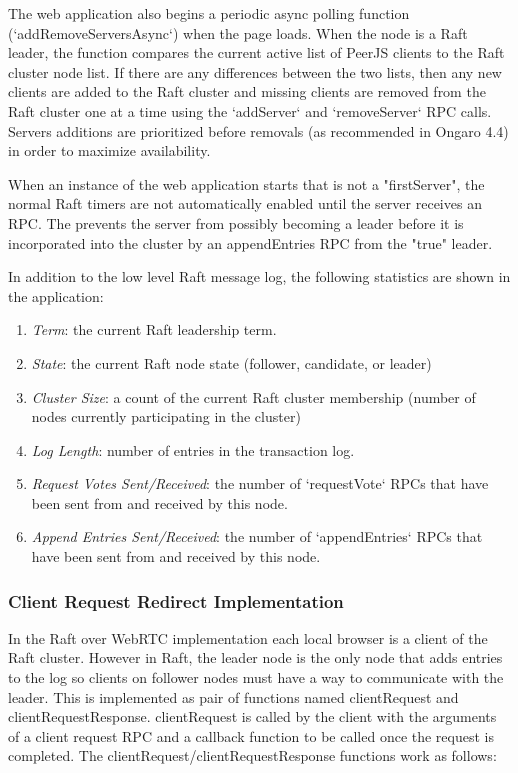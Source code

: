 \documentclass[9pt]{extarticle}
\begin{document}
\begin{multicols}{2}
The web application also begins a periodic async polling function
(`addRemoveServersAsync`) when the page loads. When the node is a Raft
leader, the function compares the current active list of PeerJS clients to
the Raft cluster node list. If there are any differences between the
two lists, then any new clients are added to the Raft cluster and
missing clients are removed from the Raft cluster one at a time using
the `addServer` and `removeServer` RPC calls. Servers additions are
prioritized before removals (as recommended in Ongaro 4.4) %
in order to maximize availability.

When an instance of the web application starts that is not
a "firstServer", the normal Raft timers are not automatically enabled
until the server receives an RPC. The prevents the server from
possibly becoming a leader before it is incorporated into the cluster
by an appendEntries RPC from the "true" leader.

In addition to the low level Raft message log, the following
statistics are shown in the application:

\begin{enumerate}
\item \emph{Term}: the current Raft leadership term.
\item \emph{State}: the current Raft node state (follower, candidate, or leader)
\item \emph{Cluster Size}: a count of the current Raft cluster membership (number of nodes currently participating in the cluster)
\item \emph{Log Length}: number of entries in the transaction log.
\item \emph{Request Votes Sent/Received}: the number of `requestVote` RPCs that have been sent from and received by this node.
\item \emph{Append Entries Sent/Received}: the number of `appendEntries` RPCs that have been sent from and received by this node.
\end{enumerate}

\subsubsection{Client Request Redirect Implementation}

In the Raft over WebRTC implementation each local browser is a client
of the Raft cluster. However in Raft, the leader node is the only node
that adds entries to the log so clients on follower nodes must have
a way to communicate with the leader. This is implemented as pair of
functions named clientRequest and clientRequestResponse. clientRequest
is called by the client with the arguments of a client request RPC and
a callback function to be called once the request is completed. The
clientRequest/clientRequestResponse functions work as follows:


\end{multicols}
\end{document}
